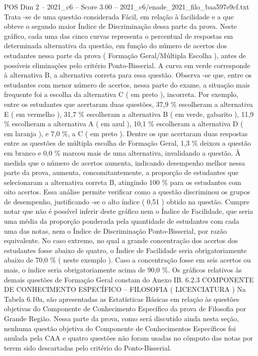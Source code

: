 \begin{textsample}{POS Dim 2 – 2021\_c6 – Score 3.00 – 2021\_c6/enade\_2021\_filo\_baa597e9cf.txt}
Trata -se de uma questão considerada Fácil, em relação à facilidade e a que obteve o segundo maior Índice de Discriminação dessa parte da prova.
Neste gráfico, cada uma das cinco curvas representa o percentual de respostas em determinada alternativa da questão, em função do número de acertos dos estudantes nessa parte da prova ( Formação Geral/Múltipla Escolha ), antes de possíveis eliminações pelo critério Ponto-Bisserial.
A curva em verde corresponde à alternativa B, a alternativa correta para essa questão.
Observa -se que, entre os estudantes com menor número de acertos, nessa parte do exame, a situação mais frequente foi a escolha da alternativa C ( em preto ), incorreta.
Por exemplo, entre os estudantes que acertaram duas questões, 37,9 \% escolheram a alternativa E ( em vermelho ), 31,7 \% escolheram a alternativa B ( em verde, gabarito ), 11,9 \% escolheram a alternativa A ( em azul ), 10,1 \% escolheram a alternativa D ( em laranja ), e 7,0 \%, a C ( em preto ).
Dentre os que acertaram duas respostas entre as questões de múltipla escolha de Formação Geral, 1,3 \% deixou a questão em branco e 0,0 \% marcou mais de uma alternativa, invalidando a questão.
À medida que o número de acertos aumenta, indicando desempenho melhor nessa parte da prova, aumenta, concomitantemente, a proporção de estudantes que selecionaram a alternativa correta B, atingindo 100 \% para os estudantes com oito acertos.
Essa análise permite verificar como a questão discriminou os grupos de desempenho, justificando -se o alto índice ( 0,51 ) obtido na questão.
Cumpre notar que não é possível inferir deste gráfico nem o Índice de Facilidade, que seria uma média da proporção ponderada pela quantidade de estudantes com cada uma das notas, nem o Índice de Discriminação Ponto-Bisserial, por razão equivalente.
No caso extremo, no qual a grande concentração dos acertos dos estudantes fosse abaixo de quatro, o Índice de Facilidade seria obrigatoriamente abaixo de 70,0 \% ( neste exemplo ).
Caso a concentração fosse em seis acertos ou mais, o índice seria obrigatoriamente acima de 90,0 \%.
Os gráficos relativos às demais questões de Formação Geral constam do Anexo IB. 6.2.3 COMPONENTE DE CONHECIMENTO ESPECÍFICO – FILOSOFIA ( LICENCIATURA ) Na Tabela 6.10a, são apresentadas as Estatísticas Básicas em relação às questões objetivas do Componente de Conhecimento Específico da prova de Filosofia por Grande Região.
Nessa parte da prova, como será discutido ainda nesta seção, nenhuma questão objetiva do Componente de Conhecimentos Específicos foi anulada pela CAA e quatro questões não foram usadas no cômputo das notas por terem sido descartadas pelo critério do Ponto-Bisserial.

\end{textsample}
